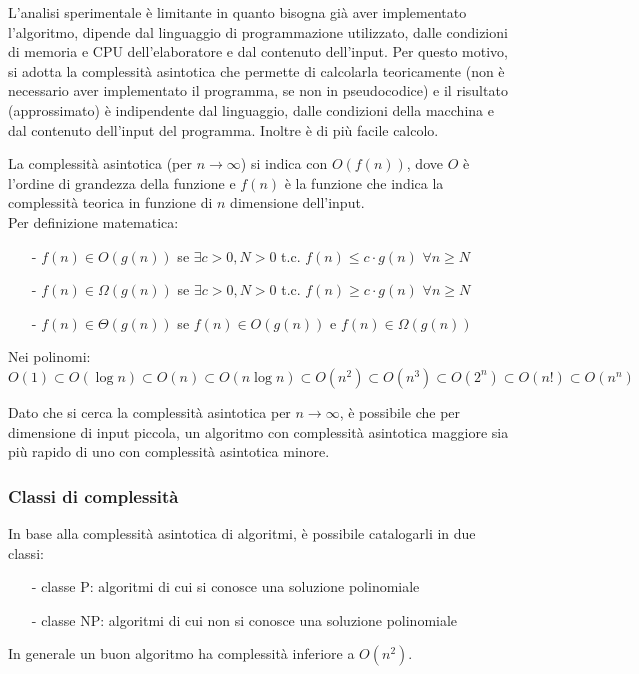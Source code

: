 \documentclass[a4paper]{article}
\begin{document}
L'analisi sperimentale è limitante in quanto bisogna già aver implementato l'algoritmo, dipende dal linguaggio di programmazione
utilizzato, dalle condizioni di memoria e CPU dell'elaboratore e dal contenuto dell'input. Per questo motivo, si adotta la complessità
asintotica che permette di calcolarla teoricamente (non è necessario aver implementato il programma, se non in pseudocodice) e
il risultato (approssimato) è indipendente dal linguaggio, dalle condizioni della macchina e dal contenuto dell'input del programma.
Inoltre è di più facile calcolo.

La complessità asintotica (per \(n \to \infty\)) si indica con \(O(f(n))\), dove \(O\) è l'ordine di grandezza della funzione e
\(f(n)\) è la funzione che indica la complessità teorica in funzione di \(n\) dimensione dell'input. \\ Per definizione matematica:
\begin{itemize} [topsep=3pt, itemsep=0pt]
	\item[-] \(f(n) \in O(g(n))\) se \(\exists c > 0, N > 0\) t.c. \(f(n) \leq c \cdot g(n)\) \(\forall n \geq N\)
	\item[-] \(f(n) \in \Omega (g(n))\) se \(\exists c > 0, N > 0\) t.c. \(f(n) \geq c \cdot g(n)\) \(\forall n \geq N\)
	\item[-] \(f(n) \in \Theta (g(n))\) se \(f(n) \in O(g(n))\) e \(f(n) \in \Omega (g(n))\)
\end{itemize}

Nei polinomi: \(O(1) \subset O(\log n) \subset O(n) \subset O(n \log n) \subset O(n^2) \subset O(n^3) \subset O(2^n) \subset O(n!) \subset O(n^n)\)

Dato che si cerca la complessità asintotica per \(n \to \infty\), è possibile che per dimensione di input piccola, un algoritmo
con complessità asintotica maggiore sia più rapido di uno con complessità asintotica minore.

\subsubsection*{Classi di complessità}
In base alla complessità asintotica di algoritmi, è possibile catalogarli in due classi:
\begin{itemize} [topsep=3pt, itemsep=0pt]
	\item[-] classe P: algoritmi di cui si conosce una soluzione polinomiale
	\item[-] classe NP: algoritmi di cui non si conosce una soluzione polinomiale
\end{itemize}
In generale un buon algoritmo ha complessità inferiore a \(O(n^2)\).
\end{document}
